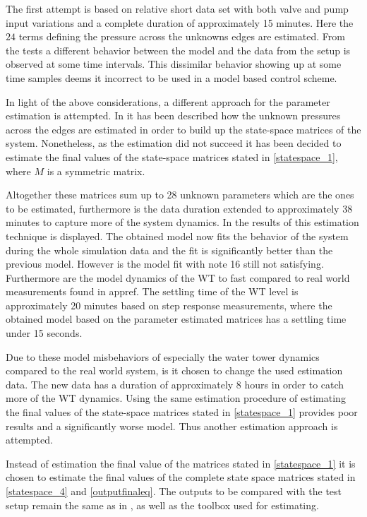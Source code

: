 The first attempt is based on relative short data set with both valve and pump input variations and a complete duration of approximately 15 minutes. Here the $24$ terms defining the pressure across the unknowns edges are estimated. 
From the tests a different behavior between the model and the data from the setup is observed at some time intervals. This dissimilar behavior showing up at some time samples deems it incorrect to be used in a model based control scheme. 

In light of the above considerations, a different approach for the parameter estimation is attempted. In  it has been described how the unknown pressures across the edges are estimated in order to build up the state-space matrices of the system. Nonetheless, as the estimation did not succeed it has been decided to estimate the final values of the state-space matrices stated in \eqref{statespace_1}, where $M$ is a symmetric matrix.

Altogether these matrices sum up to 28 unknown parameters which are the ones to be estimated, furthermore is the data duration extended to approximately 38 minutes to capture more of the system dynamics. In  the results of this estimation technique is displayed. 
The obtained model now fits the behavior of the system during the whole simulation data and the fit is significantly better than the previous model. However is the model fit with note 16 still not satisfying. 
Furthermore are the model dynamics of the WT to fast compared to real world measurements found in appref. The settling time of the WT level is approximately 20 minutes based on step response measurements, where the obtained model based on the parameter estimated matrices has a settling time under 15 seconds.

Due to these model misbehaviors of especially the water tower dynamics compared to the real world system, is it chosen to change the used estimation data. The new data has a duration of approximately 8 hours in order to catch more of the WT dynamics. Using the same estimation procedure of estimating the final values of the state-space matrices stated in \eqref{statespace_1} provides poor results and a significantly worse model. Thus another estimation approach is attempted. 

Instead of estimation the final value of the matrices stated in \eqref{statespace_1} it is chosen to estimate the final values of the complete state space matrices stated in \eqref{statespace_4} and \eqref{outputfinaleq}.               
The outputs to be compared with the test setup remain the same as in , as well as the toolbox used for estimating.


